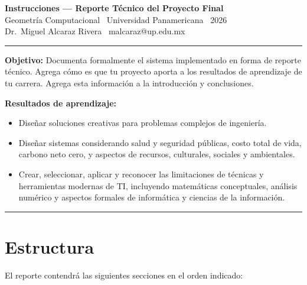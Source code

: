 \documentclass[11pt]{article}
\begin{document}
\begin{center}
  \textbf{Instrucciones — Reporte Técnico del Proyecto Final}\\[2pt]
  Geometría Computacional \textbullet\ Universidad Panamericana \textbullet\ 2026\\
  {\small Dr.\ Miguel Alcaraz Rivera \textbullet\ malcaraz@up.edu.mx}
\end{center}

\medskip
\hrule
\medskip

\textbf{Objetivo:} Documenta formalmente el sistema implementado en forma de reporte
técnico. Agrega cómo es que tu proyecto aporta a los resultados de
aprendizaje de tu carrera. Agrega esta información a la introducción y conclusiones.

\textbf{Resultados de aprendizaje:}
\begin{itemize}
  \item Diseñar soluciones creativas para problemas complejos de ingeniería.
  \item Diseñar sistemas considerando salud y seguridad públicas, costo total de
        vida, carbono neto cero, y aspectos de recursos, culturales, sociales y
        ambientales.
  \item Crear, seleccionar, aplicar y reconocer las limitaciones de técnicas y
        herramientas modernas de TI, incluyendo matemáticas conceptuales, análisis
        numérico y aspectos formales de informática y ciencias de la información.
\end{itemize}

\medskip
\hrule
\medskip

\section*{Estructura}

El reporte contendrá las siguientes secciones en el orden indicado:
\end{document}
